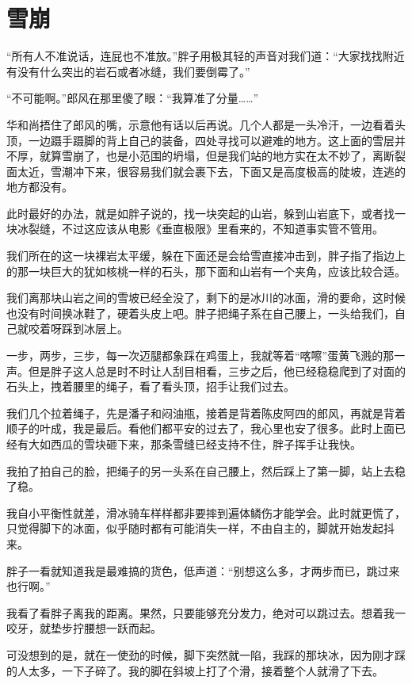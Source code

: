 \chapter{雪崩}

“所有人不准说话，连屁也不准放。”胖子用极其轻的声音对我们道：“大家找找附近有没有什么突出的岩石或者冰缝，我们要倒霉了。”

“不可能啊。”郎风在那里傻了眼：“我算准了分量……”

华和尚捂住了郎风的嘴，示意他有话以后再说。几个人都是一头冷汗，一边看着头顶，一边蹑手蹑脚的背上自己的装备，四处寻找可以避难的地方。这上面的雪层并不厚，就算雪崩了，也是小范围的坍塌，但是我们站的地方实在太不妙了，离断裂面太近，雪潮冲下来，很容易我们就会裹下去，下面又是高度极高的陡坡，连逃的地方都没有。

此时最好的办法，就是如胖子说的，找一块突起的山岩，躲到山岩底下，或者找一块冰裂缝，不过这应该从电影《垂直极限》里看来的，不知道事实管不管用。

我们所在的这一块裸岩太平缓，躲在下面还是会给雪直接冲击到，胖子指了指边上的那一块巨大的犹如核桃一样的石头，那下面和山岩有一个夹角，应该比较合适。

我们离那块山岩之间的雪坡已经全没了，剩下的是冰川的冰面，滑的要命，这时候也没有时间换冰鞋了，硬着头皮上吧。胖子把绳子系在自己腰上，一头给我们，自己就咬着呀踩到冰层上。

一步，两步，三步，每一次迈腿都象踩在鸡蛋上，我就等着“喀嚓”蛋黄飞溅的那一声。但是胖子这人总是时不时让人刮目相看，三步之后，他已经稳稳爬到了对面的石头上，拽着腰里的绳子，看了看头顶，招手让我们过去。

我们几个拉着绳子，先是潘子和闷油瓶，接着是背着陈皮阿四的郎风，再就是背着顺子的叶成，我是最后。看他们都平安的过去了，我心里也安了很多。此时上面已经有大如西瓜的雪块砸下来，那条雪缝已经支持不住，胖子挥手让我快。

我拍了拍自己的脸，把绳子的另一头系在自己腰上，然后踩上了第一脚，站上去稳了稳。

我自小平衡性就差，滑冰骑车样样都非要摔到遍体鳞伤才能学会。此时就更慌了，只觉得脚下的冰面，似乎随时都有可能消失一样，不由自主的，脚就开始发起抖来。

胖子一看就知道我是最难搞的货色，低声道：“别想这么多，才两步而已，跳过来也行啊。”

我看了看胖子离我的距离。果然，只要能够充分发力，绝对可以跳过去。想着我一咬牙，就垫步拧腰想一跃而起。

可没想到的是，就在一使劲的时候，脚下突然就一陷，我踩的那块冰，因为刚才踩的人太多，一下子碎了。我的脚在斜坡上打了个滑，接着整个人就滑了下去。

